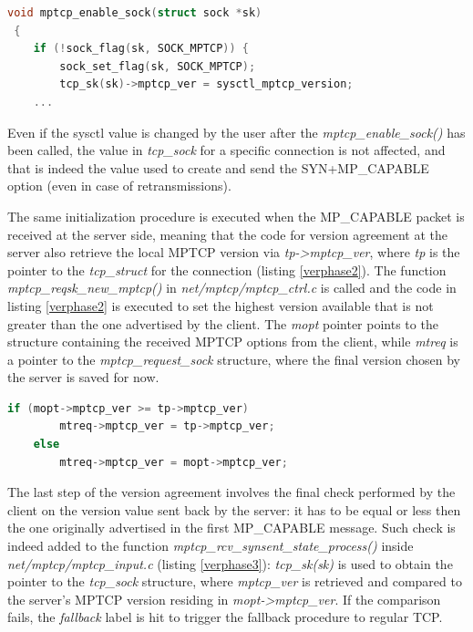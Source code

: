 \begin{lstlisting}[language=c, caption=\textit{MPTCP version agreement, initializing sysctl value}, label=verphase0]
 void mptcp_enable_sock(struct sock *sk)
 {
 	if (!sock_flag(sk, SOCK_MPTCP)) {
 		sock_set_flag(sk, SOCK_MPTCP);
		tcp_sk(sk)->mptcp_ver = sysctl_mptcp_version;
	...
\end{lstlisting}

Even if the sysctl value is changed by the user after the \textit{mptcp\_enable\_sock()} has been called, the value in \textit{tcp\_sock} for a specific connection is not affected, and that is indeed the value used to create and send the SYN+MP\_CAPABLE option (even in case of retransmissions). 


The same initialization procedure is executed when the MP\_CAPABLE packet is received at the server side, meaning that the code for version agreement at the server also retrieve the local MPTCP version via \textit{tp->mptcp\_ver}, where \textit{tp} is the pointer to the \textit{tcp\_struct} for the connection (listing \ref{verphase2}). The function \textit{mptcp\_reqsk\_new\_mptcp()} in \textit{net/mptcp/mptcp\_ctrl.c} is called and the code in listing \ref{verphase2} is executed to set the highest version available that is not greater than the one advertised by the client. The \textit{mopt} pointer points to the structure containing the received MPTCP options from the client, while \textit{mtreq} is a pointer to the \textit{mptcp\_request\_sock} structure, where the final version chosen by the server is saved for now.

\begin{lstlisting}[language=c, caption=\textit{MPTCP version agreement, phase 2}, label=verphase2]
	if (mopt->mptcp_ver >= tp->mptcp_ver)
		mtreq->mptcp_ver = tp->mptcp_ver;
	else
		mtreq->mptcp_ver = mopt->mptcp_ver;
\end{lstlisting}

The last step of the version agreement involves the final check performed by the client on the version value sent back by the server: it has to be equal or less then the one originally advertised in the first MP\_CAPABLE message. Such check is indeed added to the function \textit{mptcp\_rcv\_synsent\_state\_process()} inside \textit{net/mptcp/mptcp\_input.c} (listing \ref{verphase3}): \textit{tcp\_sk(sk)} is used to obtain the pointer to the \textit{tcp\_sock} structure, where \textit{mptcp\_ver} is retrieved and compared to the server's MPTCP version residing in \textit{mopt->mptcp\_ver}. If the comparison fails, the \textit{fallback} label is hit to trigger the fallback procedure to regular TCP.


